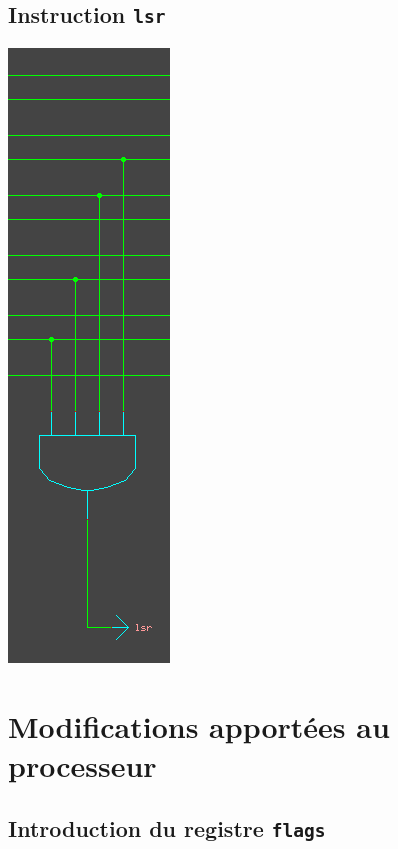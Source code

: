 \documentclass[11pt, a4paper, twoside, titlepage]{article}
\begin{document}
\subsection{Instruction \texttt{lsr}}
\centerline{\includegraphics[scale=.6]{log_lsr}}

\newpage
\section{Modifications apportées au processeur}

\subsection{Introduction du registre \texttt{flags}}
\end{document}
